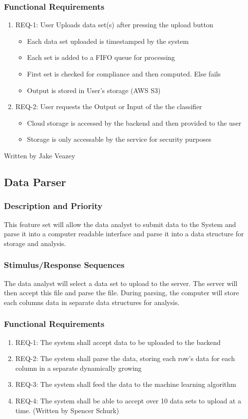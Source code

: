 \documentclass[12pt,oneside,letterpaper]{article}
\begin{document}
\subsubsection{Functional Requirements}
\begin{enumerate}
\item REQ-1: User Uploads data set(s) after pressing the upload button
\begin{itemize}
    \item Each data set uploaded is timestamped by the system
    \item Each set is added to a FIFO queue for processing
    \item First set is checked for compliance and then computed. Else fails
    \item Output is stored in User's storage (AWS S3)
\end{itemize}
\item REQ-2: User requests the Output or Input of the the classifier
\begin{itemize}
    \item Cloud storage is accessed by the backend and then provided to the user
    \item Storage is only accessable by the service for security purposes
\end{itemize}
\end{enumerate}
Written by Jake Veazey

\subsection{Data Parser}
\subsubsection{Description and Priority}
This feature set will allow the data analyst to submit data to the System and parse it into a computer readable interface and parse it into a data structure for storage and analysis. \subsubsection{Stimulus/Response Sequences}
The data analyst will select a data set to upload to the server. The server will then accept this file and parse the file. During parsing, the computer will store each columns data in separate data structures for analysis. 
\subsubsection{Functional Requirements}
\begin{enumerate}
\item REQ-1: The system shall accept data to be uploaded to the backend
\item REQ-2: The system shall parse the data, storing each row's data for each column in a separate dynamically growing
\item REQ-3: The system shall feed the data to the machine learning algorithm
\item REQ-4: The system shall be able to accept over 10 data sets to upload at a time. (Written by Spencer Schurk)
\end{enumerate}
\end{document}
